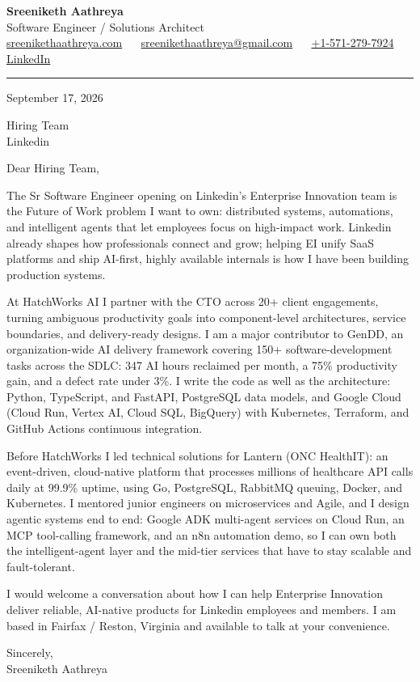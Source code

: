 \documentclass[11pt, letterpaper]{article}
\begin{document}
{\fontsize{18 pt}{20 pt}\selectfont\bfseries Sreeniketh Aathreya}\\[4pt]
Software Engineer / Solutions Architect\\[6pt]
\href{https://sreenikethaathreya.com}{sreenikethaathreya.com}
~\textbullet~
\href{mailto:sreenikethaathreya@gmail.com}{sreenikethaathreya@gmail.com}
~\textbullet~
\href{tel:+1-571-279-7924}{+1-571-279-7924}
~\textbullet~
\href{https://www.linkedin.com/in/sreeniketh-aathreya-16800b122/}{LinkedIn}

\vspace{12pt}
\hrule
\vspace{12pt}

September 17, 2026

\vspace{8pt}

Hiring Team\\
Linkedin

\vspace{12pt}

Dear Hiring Team,

The Sr Software Engineer opening on Linkedin's Enterprise Innovation team is the Future of Work problem I want to own: distributed systems, automations, and intelligent agents that let employees focus on high-impact work. Linkedin already shapes how professionals connect and grow; helping EI unify SaaS platforms and ship AI-first, highly available internals is how I have been building production systems.

At HatchWorks AI I partner with the CTO across 20+ client engagements, turning ambiguous productivity goals into component-level architectures, service boundaries, and delivery-ready designs. I am a major contributor to GenDD, an organization-wide AI delivery framework covering 150+ software-development tasks across the SDLC: 347 AI hours reclaimed per month, a 75\% productivity gain, and a defect rate under 3\%. I write the code as well as the architecture: Python, TypeScript, and FastAPI, PostgreSQL data models, and Google Cloud (Cloud Run, Vertex AI, Cloud SQL, BigQuery) with Kubernetes, Terraform, and GitHub Actions continuous integration.

Before HatchWorks I led technical solutions for Lantern (ONC HealthIT): an event-driven, cloud-native platform that processes millions of healthcare API calls daily at 99.9\% uptime, using Go, PostgreSQL, RabbitMQ queuing, Docker, and Kubernetes. I mentored junior engineers on microservices and Agile, and I design agentic systems end to end: Google ADK multi-agent services on Cloud Run, an MCP tool-calling framework, and an n8n automation demo, so I can own both the intelligent-agent layer and the mid-tier services that have to stay scalable and fault-tolerant.

I would welcome a conversation about how I can help Enterprise Innovation deliver reliable, AI-native products for Linkedin employees and members. I am based in Fairfax / Reston, Virginia and available to talk at your convenience.

Sincerely,\\[12pt]
Sreeniketh Aathreya
\end{document}
